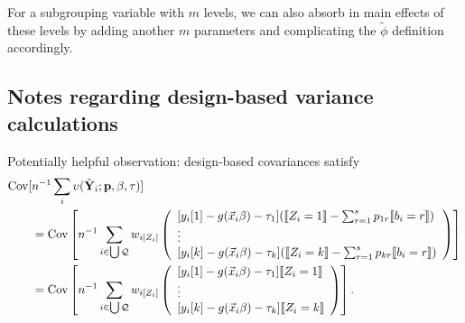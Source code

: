\documentclass{article}
\DeclarePairedDelimiter{\indicator}{\llbracket}{\rrbracket}
\newcommand{\owt}[1][z_i]{\ensuremath{w_{i[#1]}}}
\begin{document}
For a subgrouping variable with $m$ levels,
we can also absorb in main effects of these levels by adding another
$m$ parameters and complicating the $\tilde{\phi}$ definition accordingly. 


\subsection{Notes regarding design-based variance calculations}

Potentially helpful observation:
design-based covariances satisfy
\begin{align*}
  \operatorname{Cov}[&n^{-1}\sum_{i}\upsilon(\tilde{\mathbf{Y}}_{i};
  \mathbf{p}, \beta, \tau)] \\
                     &=   \operatorname{Cov}\left[n^{-1}\sum_{i \in \bigcup \mathcal{Q}}
                       \owt[Z_{i}]
\left(
                                             \begin{array}{l}                                               
           [y_{i}[1]
                                               -
                                               g(\vec{x}_{i}\beta)-\tau_{1}](
                                               \indicator{Z_{i}=1} - \sum_{r=1}^{s}p_{1r}\indicator{b_{i}=r})\\
                  \vdots \\
{}           [y_{i}[k]
                                               - g(\vec{x}_{i}\beta) -
                                               \tau_{k}](\indicator{Z_{i}=k}
                                               - \sum_{r=1}^{s}p_{kr}\indicator{b_{i}=r})\\                                             \end{array}
\right) \right]\\
                     &=  \operatorname{Cov}\left[n^{-1}\sum_{i \in \bigcup \mathcal{Q}}
\owt[Z_{i}]
\left(
                                             \begin{array}{l}                                               
           [y_{i}[1]
                                               -
                                               g(\vec{x}_{i}\beta)-\tau_{1}]
                                               \indicator{Z_{i}=1}\\
                  \vdots \\
{}           [y_{i}[k]
                                               - g(\vec{x}_{i}\beta) -
                                               \tau_{k}]\indicator{Z_{i}=k}\\                                             \end{array}
\right)
\right].
\end{align*}
\end{document}
